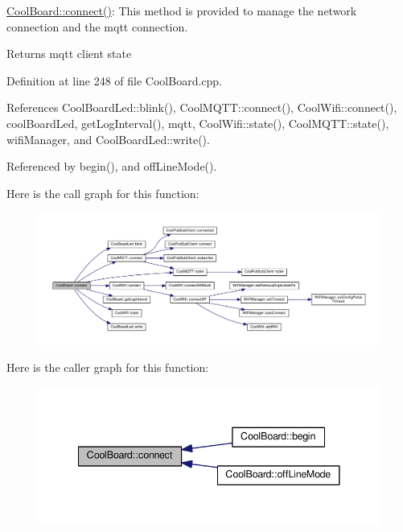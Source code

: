 \hyperlink{class_cool_board_a519de78b807f8ec6463ff484eb925918}{Cool\+Board\+::connect()}\+: This method is provided to manage the network connection and the mqtt connection.

\begin{DoxyReturn}{Returns}
mqtt client state 
\end{DoxyReturn}


Definition at line 248 of file Cool\+Board.\+cpp.



References Cool\+Board\+Led\+::blink(), Cool\+M\+Q\+T\+T\+::connect(), Cool\+Wifi\+::connect(), cool\+Board\+Led, get\+Log\+Interval(), mqtt, Cool\+Wifi\+::state(), Cool\+M\+Q\+T\+T\+::state(), wifi\+Manager, and Cool\+Board\+Led\+::write().



Referenced by begin(), and off\+Line\+Mode().

Here is the call graph for this function\+:
\nopagebreak
\begin{figure}[H]
\begin{center}
\leavevmode
\includegraphics[width=350pt]{d7/df9/class_cool_board_a519de78b807f8ec6463ff484eb925918_cgraph}
\end{center}
\end{figure}
Here is the caller graph for this function\+:
\nopagebreak
\begin{figure}[H]
\begin{center}
\leavevmode
\includegraphics[width=341pt]{d7/df9/class_cool_board_a519de78b807f8ec6463ff484eb925918_icgraph}
\end{center}
\end{figure}
\mbox{\label{class_cool_board_ad7442cf4b62c7b0d5bd62a0f75ffc065}} 
